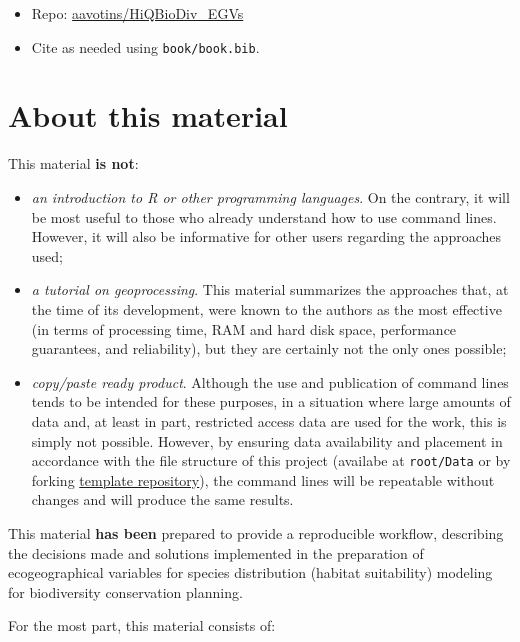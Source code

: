 \documentclass[
]{book}
\newcommand{\passthrough}[1]{#1}
\providecommand{\tightlist}{%
  \setlength{\itemsep}{0pt}\setlength{\parskip}{0pt}}
\begin{document}
\begin{itemize}
\tightlist
\item
  Repo: \href{https://github.com/aavotins/HiQBioDiv_EGVs}{aavotins/HiQBioDiv\_EGVs}
\item
  Cite as needed using \passthrough{\lstinline!book/book.bib!}.
\end{itemize}

\section*{About this material}\label{about-this-material}

This material \textbf{is not}:

\begin{itemize}
\item
  \emph{an introduction to R or other programming languages}. On the contrary, it will
  be most useful to those who already understand how to use command lines.
  However, it will also be informative for other users regarding the approaches used;
\item
  \emph{a tutorial on geoprocessing}. This material summarizes the approaches that,
  at the time of its development, were known to the authors as the most
  effective (in terms of processing time, RAM and hard disk space, performance
  guarantees, and reliability), but they are certainly not the only ones possible;
\item
  \emph{copy/paste ready product}. Although the use and publication of command lines
  tends to be intended for these purposes, in a situation where large amounts of
  data and, at least in part, restricted access data are used for the work, this
  is simply not possible. However, by ensuring data availability and placement in
  accordance with the file structure of this project (availabe at \passthrough{\lstinline!root/Data!} or
  by forking \href{https://github.com/aavotins/HiQBioDiv_FileTree}{template repository}), the
  command lines will be repeatable without changes and will produce the same results.
\end{itemize}

This material \textbf{has been} prepared to provide a reproducible workflow, describing
the decisions made and solutions implemented in the preparation of ecogeographical
variables for species distribution (habitat suitability) modeling for biodiversity
conservation planning.

For the most part, this material consists of:
\end{document}
